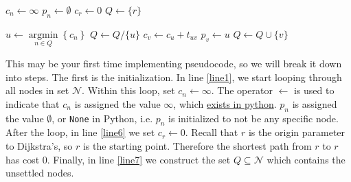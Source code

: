 \documentclass[11pt]{article}
\newcommand{\N}{\mathcal{N}}
\newcommand{\A}{\mathcal{A}}
\DeclareMathOperator*{\argmin}{\arg\min}
\begin{document}
\begin{algorithmic}[1]
	\For{$n\in \N$}  \label{line1}
	\State $c_n \leftarrow \infty$
	\State $p_n \leftarrow \emptyset$
	\EndFor
	\State $c_r \leftarrow 0$ \label{line6}
	\State  $Q\leftarrow \{r\}$ \label{line7}
	
	\vspace{0.5\baselineskip}
	
	  \label{line8}
	\State $u\leftarrow \argmin\limits_{n\in Q} \left\{ c_n\right\}$ \label{line9}
	\State $Q\leftarrow Q/\{u\}$
	\For{$(u,v)\in\A$} \label{line10}
	  \label{line11}
	\State $c_v \leftarrow c_u + t_{uv}$  \label{line12}
	\State $p_v \leftarrow u$
	\State $Q\leftarrow Q\cup \{v\}$ \label{line14}
	\EndIf
	\EndFor
	\EndWhile \label{line17}
	\EndProcedure 
	
\end{algorithmic}

\vspace{\baselineskip}

\noindent This may be your first time implementing pseudocode, so we will break it down into steps. The first is the initialization. In line \ref{line1}, we start looping through all nodes in set $\N$. Within this loop, set $c_n \leftarrow \infty$. The operator $\leftarrow$ is used to indicate that $c_n$ is assigned the value $\infty$, which \href{https://www.w3schools.com/python/ref_math_inf.asp}{exists in python}. $p_n$ is assigned the value $\emptyset$, or \texttt{None} in Python, i.e. $p_n$ is initialized to not be any specific node. After the loop, in line \ref{line6} we set $c_r\leftarrow 0$. Recall that $r$ is the origin parameter to Dijkstra's, so $r$ is the starting point. Therefore the shortest path from $r$ to $r$ has cost $0$. Finally, in line \ref{line7} we construct the set $Q\subseteq\N$ which contains the unsettled nodes. 
\end{document}
